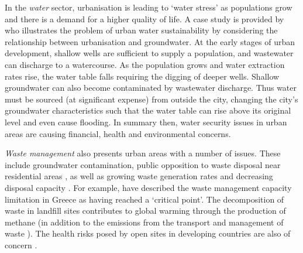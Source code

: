 In the \emph{water} sector, urbanisation is leading to `water stress' as populations grow and there is a demand for a higher quality of life. A case study is provided by \citet{Kennedy2008} who illustrates the problem of urban water sustainability by considering the relationship between urbanisation and groundwater. At the early stages of urban development, shallow wells are sufficient to supply a population, and wastewater can discharge to a watercourse. As the population grows and water extraction rates rise, the water table falls requiring the digging of deeper wells. Shallow groundwater can also become contaminated by wastewater discharge. Thus water must be sourced (at significant expense) from outside the city, changing the city's groundwater characteristics such that the water table can rise above its original level and even cause flooding. In summary then, water security issues in urban areas are causing financial, health and environmental concerns.

\emph{Waste management} also presents urban areas with a number of issues. These include groundwater contamination, public opposition to waste disposal near residential areas \citep{Li2006}, as well as growing waste generation rates and decreasing disposal capacity \citep{Lu2009}. For example, \citet{Xydis2012} have described the waste management capacity limitation in Greece as having reached a `critical point'. The decomposition of waste in landfill sites contributes to global warming through the production of methane (in addition to the emissions from the transport and management of waste \citep{ICE2011}). The health risks posed by open sites in developing countries are also of concern \cite{Durand2013}.


